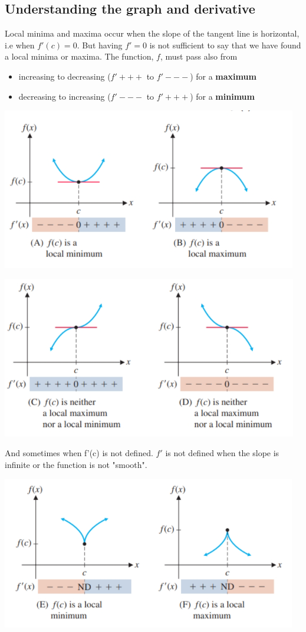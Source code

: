\documentclass[14pt]{extarticle}
\begin{document}
\subsection{Understanding the graph and derivative}
Local minima and maxima occur when the slope of the tangent line is horizontal, i.e when $f'(c) = 0$. But having $f'=0$ is not sufficient to say that we have found a local minima or maxima. The function, $f$, must pass also from
\begin{itemize}
	\item increasing to decreasing ($f'+++$ to $f'---$) for a \textbf{maximum}
	\item decreasing to increasing ($f'---$ to $f'+++$) for a \textbf{minimum}
\end{itemize}
\begin{center}\includegraphics[width=0.7\linewidth]{11-1-a2}\end{center}
\begin{center}\includegraphics[width=0.7\linewidth]{11-1-a3}\end{center}
\vspace{1em}
And sometimes when f'(c) is not defined. $f'$ is not defined when the slope is infinite or the function is not "smooth".
\begin{center}\includegraphics[width=0.7\linewidth]{11-1-a4}\end{center}
\end{document}
